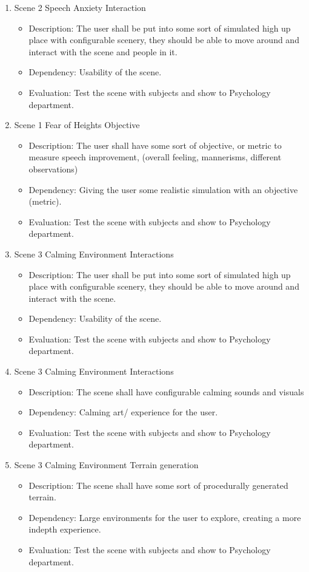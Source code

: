 \documentclass[a4paper,10pt]{article}
\begin{document}
\begin{enumerate}
		\item Scene 2 Speech Anxiety Interaction
		\begin{itemize}
		\item Description: The user shall be put into some sort of simulated high up place with configurable scenery, they should be able to move around and interact with the scene and people in it.
		\item Dependency: Usability of the scene.
		\item Evaluation: Test the scene with subjects and show to Psychology department. 
		\end{itemize}
		\item Scene 1 Fear of Heights Objective 
		\begin{itemize}
		\item Description: The user shall have some sort of objective, or metric to measure speech improvement, (overall feeling, mannerisms, different observations)
		\item Dependency: Giving the user some realistic simulation with an objective (metric).
		\item Evaluation: Test the scene with subjects and show to Psychology department. 
		\end{itemize}
		
		
		\item Scene 3 Calming Environment Interactions
		\begin{itemize}
		\item Description: The user shall be put into some sort of simulated high up place with configurable scenery, they should be able to move around and interact with the scene.
		\item Dependency: Usability of the scene.
		\item Evaluation: Test the scene with subjects and show to Psychology department. 
		\end{itemize}
		
		\item Scene 3 Calming Environment Interactions 
		\begin{itemize}
		\item Description: The scene shall have configurable calming sounds and visuals
		\item Dependency: Calming art/ experience for the user.
		\item Evaluation: Test the scene with subjects and show to Psychology department. 
		\end{itemize}
		
		\item Scene 3 Calming Environment Terrain generation
		\begin{itemize}
		\item Description: The scene shall have some sort of procedurally generated terrain. 
		\item Dependency: Large environments for the user to explore, creating a more indepth experience.
		\item Evaluation: Test the scene with subjects and show to Psychology department. 
		\end{itemize}
		
	\end{enumerate}
\end{document}

